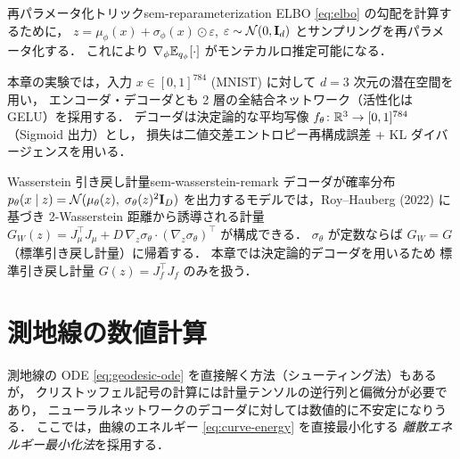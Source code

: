 \begin{remark}{再パラメータ化トリック}{sem-reparameterization}
  ELBO \eqref{eq:elbo} の勾配を計算するために，
  $z = \mu_\phi(x) + \sigma_\phi(x) \odot \varepsilon$,
  $\varepsilon \sim \mathcal{N}(0, \mathbf{I}_d)$
  とサンプリングを再パラメータ化する．
  これにより $\nabla_\phi \mathbb{E}_{q_\phi}[\cdot]$ がモンテカルロ推定可能になる．
\end{remark}

本章の実験では，入力 $x \in [0,1]^{784}$ (MNIST) に対して
$d = 3$ 次元の潜在空間を用い，
エンコーダ・デコーダとも 2 層の全結合ネットワーク（活性化は GELU）を採用する．
デコーダは決定論的な平均写像 $f_\theta \colon \mathbb{R}^3 \to [0,1]^{784}$（Sigmoid 出力）とし，
損失は二値交差エントロピー再構成誤差 + KL ダイバージェンスを用いる．


\begin{remark}{Wasserstein 引き戻し計量}{sem-wasserstein-remark}
  デコーダが確率分布
  $p_\theta(x \mid z) = \mathcal{N}(\mu_\theta(z),\; \sigma_\theta(z)^2 \mathbf{I}_D)$
  を出力するモデルでは，Roy--Hauberg (2022) に基づき
  2-Wasserstein 距離から誘導される計量
  $G_W(z) = J_\mu^\top J_\mu + D\, \nabla_z\sigma_\theta \cdot (\nabla_z\sigma_\theta)^\top$
  が構成できる．
  $\sigma_\theta$ が定数ならば $G_W = G$（標準引き戻し計量）に帰着する．
  本章では決定論的デコーダを用いるため
  標準引き戻し計量 $G(z) = J_f^\top J_f$ のみを扱う．
\end{remark}

\section{測地線の数値計算}
\label{sec:sem-geodesic-computation}

測地線の ODE \eqref{eq:geodesic-ode} を直接解く方法（シューティング法）もあるが，
クリストッフェル記号の計算には計量テンソルの逆行列と偏微分が必要であり，
ニューラルネットワークのデコーダに対しては数値的に不安定になりうる．
ここでは，曲線のエネルギー \eqref{eq:curve-energy} を直接最小化する
\emph{離散エネルギー最小化法}を採用する．

